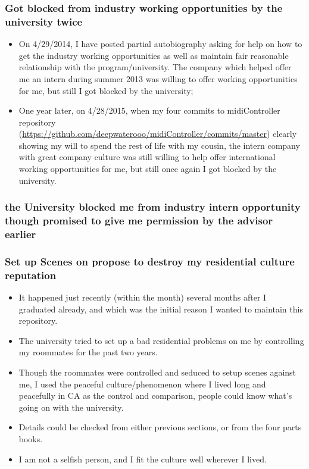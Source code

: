 \documentclass[9pt,b5paper]{article}
\begin{document}
\subsubsection{Got blocked from industry working opportunities by the university twice}
\label{sec-12-3-8}
\begin{itemize}
\item On 4/29/2014, I have posted partial autobiography asking for help on how to get the industry working opportunities as well as maintain fair reasonable relationship with the program/university. The company which helped offer me an intern during summer 2013 was willing to offer working opportunities for me, but still I got blocked by the university;
\item One year later, on 4/28/2015, when my four commits to midiController repository (\url{https://github.com/deepwaterooo/midiController/commits/master}) clearly showing my will to spend the rest of life with my cousin, the intern company with great company culture was still willing to help offer international working opportunities for me, but still once again I got blocked by the university.
\end{itemize}

\subsubsection{the University blocked me from industry intern opportunity though promised to give me permission by the advisor earlier}
\label{sec-12-3-9}

\subsubsection{Set up Scenes on propose to destroy my residential culture reputation}
\label{sec-12-3-10}
\begin{itemize}
\item It happened just recently (within the month) several months after I graduated already, and which was the initial reason I wanted to maintain this repository.
\item The university tried to set up a bad residential problems on me by controlling my roommates for the past two years.
\item Though the roommates were controlled and seduced to setup scenes against me, I used the peaceful culture/phenomenon where I lived long and peacefully in CA as the control and comparison, people could know what's going on with the university.
\item Details could be checked from either previous sections, or from the four parts books.
\item I am not a selfish person, and I fit the culture well wherever I lived.
\end{itemize}
\end{document}
